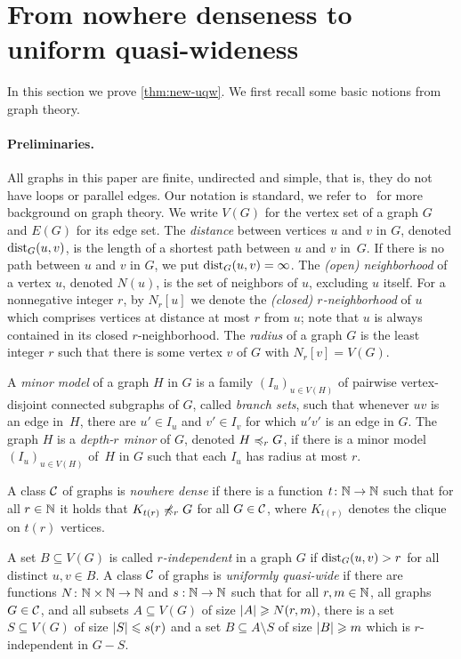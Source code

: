 \section{From nowhere denseness to uniform quasi-wideness}\label{sec:uqw}

In this section we prove \cref{thm:new-uqw}. 
We first recall some basic notions from graph theory. 

\paragraph*{Preliminaries.}
All graphs in this paper are finite, undirected and simple, that is, 
they do not have loops or parallel edges. Our notation is standard,
we refer to~\cite{diestel2012graph} for more background on 
graph theory. 
We write $V(G)$ for the vertex set of a graph $G$ and
$E(G)$ for its edge set. 
The {\em{distance}} between vertices $u$ and $v$ in $G$, denoted $\mathrm{dist}_G(u,v)$, is the length of a shortest path between $u$ and $v$ in~$G$.
If there is no path between $u$ and $v$ in $G$, we put $\mathrm{dist}_G(u,v)=\infty$.
The {\em{(open) neighborhood}} of a vertex $u$, denoted $N(u)$, is the set of neighbors of $u$, excluding $u$ itself.
For a nonnegative integer $r$, by $N_r[u]$ we denote the {\em{(closed) $r$-neighborhood}} of $u$ which comprises vertices at distance at most $r$ from $u$; note that $u$ is always contained in its closed $r$-neighborhood. The \emph{radius} of a graph $G$ is the least integer $r$ such that there is some vertex $v$ of $G$ with $N_r[v]=V(G)$.


A {\em{minor model}} of a graph $H$ in $G$ is a family $(I_u)_{u\in V(H)}$ of pairwise vertex-disjoint connected subgraphs of $G$, called {\em{branch sets}},
such that whenever $uv$ is an edge in~$H$, there are $u'\in I_u$ and $v'\in I_v$ for which $u'v'$ 
is an edge in $G$.
The graph $H$ is a {\em{depth-$r$ minor}} of $G$, denoted $H\preccurlyeq_rG$, if there is a minor model
$(I_u)_{u\in V(H)}$ of~$H$ in $G$ such that each $I_u$ has radius at most $r$.

A class $\mathcal{C}$ of graphs is \emph{nowhere dense} if there is a function 
$t\colon \mathbb{N}\rightarrow \mathbb{N}$ such that for all $r\in \mathbb{N}$ it holds that $K_{t(r)}\not\preccurlyeq_r G$
for all $G\in \mathcal{C}$, where $K_{t(r)}$ denotes the clique on $t(r)$ vertices.

A set $B\subseteq V(G)$ is called {\em{$r$-independent}} in a graph $G$ if  $\mathrm{dist}_G(u,v)>r$ for all
distinct $u,v\in B$.
A class $\mathcal{C}$ of graphs is \emph{uniformly quasi-wide} if there are
functions $N\colon \mathbb{N}\times\mathbb{N}\rightarrow \mathbb{N}$ and $s:\mathbb{N}\rightarrow \mathbb{N}$ such
that for all $r,m\in \mathbb{N}$, all graphs $G\in \mathcal{C}$, and all subsets $A\subseteq V(G)$ of size $\left\lvert A\right\rvert\geqslant N(r,m)$, there is a set
$S\subseteq V(G)$ of size $\left\lvert S\right\rvert\leqslant s(r)$ and a set
$B\subseteq A\setminus S$ of size $\left\lvert B\right\rvert\geqslant m$ which is $r$-independent in
$G-S$. 

